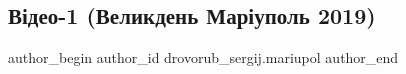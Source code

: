  
 
 
 
 
 
\subsection{Відео-1 (Великдень Маріуполь 2019)}
\label{sec:26_04_2019.fb.drovorub_sergij.mariupol.1.video_1_velykden_2019}
 
\ifcmt
 author_begin
   author_id drovorub_sergij.mariupol
 author_end
\fi
